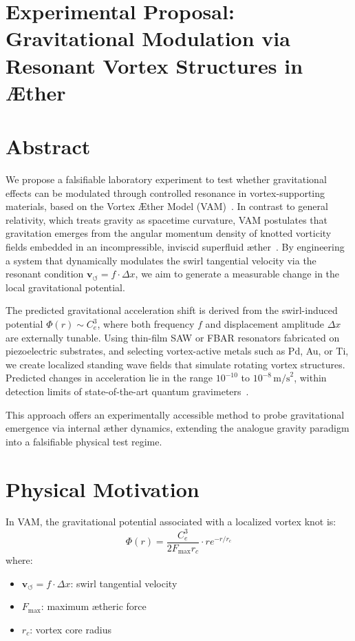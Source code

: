     \section{\textbf{Experimental Proposal: Gravitational Modulation via Resonant Vortex Structures in Æther}}
    \section*{Abstract}
        We propose a falsifiable laboratory experiment to test whether gravitational effects can be modulated through controlled resonance in vortex-supporting materials, based on the Vortex \AE{}ther Model (VAM)~\cite{iskandarani2025vam2, iskandarani2025benchmark}. In contrast to general relativity, which treats gravity as spacetime curvature, VAM postulates that gravitation emerges from the angular momentum density of knotted vorticity fields embedded in an incompressible, inviscid superfluid \ae ther~\cite{iskandarani2025timedilation}. By engineering a system that dynamically modulates the swirl tangential velocity via the resonant condition \( \mathbf{v}_{\scriptscriptstyle\boldsymbol{\circlearrowleft}} = f \cdot \Delta x \), we aim to generate a measurable change in the local gravitational potential.

        The predicted gravitational acceleration shift is derived from the swirl-induced potential \(\Phi(r) \sim C_e^3\), where both frequency \(f\) and displacement amplitude \(\Delta x\) are externally tunable. Using thin-film SAW or FBAR resonators fabricated on piezoelectric substrates, and selecting vortex-active metals such as Pd, Au, or Ti, we create localized standing wave fields that simulate rotating vortex structures. Predicted changes in acceleration lie in the range \(10^{-10}\) to \(10^{-8} \, \text{m/s}^2\), within detection limits of state-of-the-art quantum gravimeters~\cite{iskandarani2025experimentalCe}.

        This approach offers an experimentally accessible method to probe gravitational emergence via internal æther dynamics, extending the analogue gravity paradigm into a falsifiable physical test regime.


    \section*{Physical Motivation}
    In VAM, the gravitational potential associated with a localized vortex knot is:
    \begin{equation}
        \Phi(r) = \frac{C_e^3}{2 F_{\text{max}} r_c} \cdot r e^{-r / r_c}
    \end{equation}
    where:
    \begin{itemize}
        \item \( \mathbf{v}_{\scriptscriptstyle\boldsymbol{\circlearrowleft}} = f \cdot \Delta x \): swirl tangential velocity
        \item \( F_{\text{max}} \): maximum ætheric force
        \item \( r_c \): vortex core radius
    \end{itemize}

